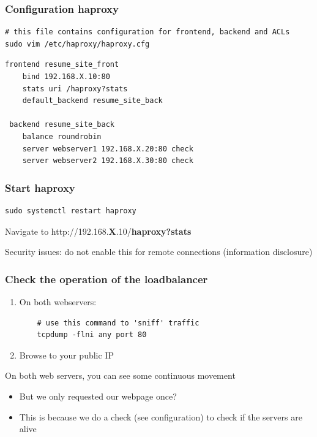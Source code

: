 \documentclass{article}
\begin{document}
\subsubsection{Configuration haproxy}

\begin{verbatim}
# this file contains configuration for frontend, backend and ACLs
sudo vim /etc/haproxy/haproxy.cfg
\end{verbatim}

\begin{verbatim}
frontend resume_site_front
    bind 192.168.X.10:80
    stats uri /haproxy?stats
    default_backend resume_site_back
 
 backend resume_site_back
    balance roundrobin
    server webserver1 192.168.X.20:80 check
    server webserver2 192.168.X.30:80 check
\end{verbatim}

\subsubsection{Start haproxy}

\begin{verbatim}
sudo systemctl restart haproxy
\end{verbatim}

Navigate to http://192.168.\textbf{X}.10/\textbf{haproxy?stats}

Security issues: do not enable this for remote connections (information disclosure)

\subsubsection{Check the operation of the loadbalancer}

\begin{enumerate}
    \item On both webservers: 
\begin{verbatim}
    # use this command to 'sniff' traffic
    tcpdump -flni any port 80
\end{verbatim}
    \item Browse to your public IP
\end{enumerate}

On both web servers, you can see some continuous movement

\begin{itemize}
    \item But we only requested our webpage once?
    \item This is because we do a check (see configuration) to check if the servers are alive
\end{itemize}
\end{document}
